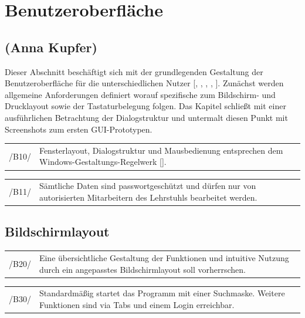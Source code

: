 \section{Benutzeroberfläche}
\label{sec:Benutzeroberfläche}

\subsection*{(Anna Kupfer)}

Dieser Abschnitt beschäftigt sich mit der grundlegenden Gestaltung der Benutzeroberfläche für die unterschiedlichen Nutzer [\cite{UniRos12b}, \cite{UniRos12c}, \cite{balzert1996} \cite{Balzert2009}, \cite{Schae12}, \cite{Jurij07}]. Zunächst werden allgemeine Anforderungen definiert worauf spezifische zum Bildschirm- und Drucklayout sowie der Tastaturbelegung folgen. Das Kapitel schließt mit einer ausführlichen Betrachtung der Dialogstruktur und untermalt diesen Punkt mit Screenshots zum ersten GUI-Prototypen.


\begin{tabular}{p{1.5cm}p{14.5cm}}
 /B10/	& Fensterlayout, Dialogstruktur und Mausbedienung entsprechen dem Windows-Gestaltungs-Regelwerk [\cite{microsoft1995windows}]. \\[0.25cm]	 
\end{tabular}

\begin{tabular}{p{1.5cm}p{14.5cm}}
 /B11/	& Sämtliche Daten sind passwortgeschützt und dürfen nur von autorisierten Mitarbeitern des Lehrstuhls bearbeitet werden. \\[0.25cm]	 
\end{tabular}


\subsection{Bildschirmlayout}

\begin{tabular}{p{1.5cm}p{14.5cm}}
 /B20/	& Eine übersichtliche Gestaltung der Funktionen und intuitive Nutzung durch ein angepasstes Bildschirmlayout soll vorherrschen. \\[0.25cm]	 
\end{tabular}	

\begin{tabular}{p{1.5cm}p{14.5cm}}
 /B30/	& Standardmäßig startet das Programm mit einer Suchmaske. Weitere Funktionen sind via Tabs und einem Login erreichbar. \\[0.25cm]	 
\end{tabular}

